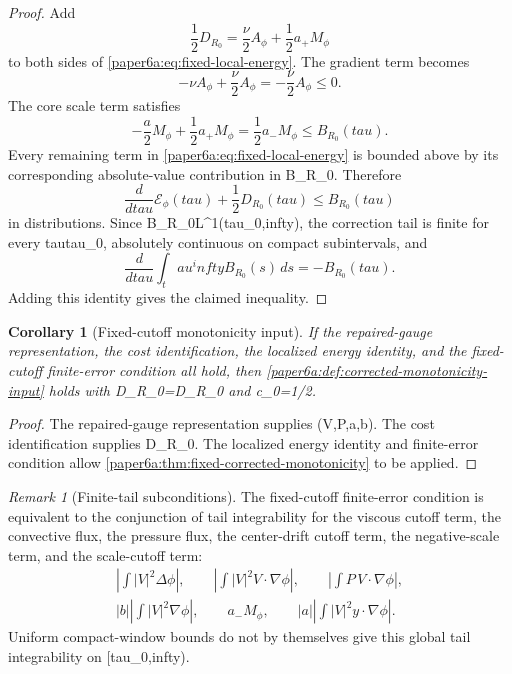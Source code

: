 \documentclass[11pt]{amsart}
\def\({}%
\def\){}%
\def\tilde#1{#1}%
\def\mathfrak#1{#1}%
\def\tau{tau}%
\def\infty{infty}%
\theoremstyle{plain}
\newtheorem{corollary}[theorem]{Corollary}
\theoremstyle{definition}
\theoremstyle{remark}
\newtheorem{remark}[theorem]{Remark}
\begin{document}
\begin{proof}
Add
\[
  \frac12\tilde{\mathfrak D}_{R_0}
  =
  \frac{\nu}{2}A_\phi+\frac12a_+M_\phi
\]
to both sides of \eqref{paper6a:eq:fixed-local-energy}.  The gradient term
becomes
\[
  -\nu A_\phi+\frac{\nu}{2}A_\phi=-\frac{\nu}{2}A_\phi\le0.
\]
The core scale term satisfies
\[
  -\frac{a}{2}M_\phi+\frac12a_+M_\phi
  =
  \frac12a_-M_\phi
  \le B_{R_0}(\tau).
\]
Every remaining term in \eqref{paper6a:eq:fixed-local-energy} is bounded above
by its corresponding absolute-value contribution in \(B_{R_0}\).  Therefore
\[
  \frac{d}{d\tau}\mathcal E_\phi(\tau)
  +\frac12\tilde{\mathfrak D}_{R_0}(\tau)
  \le B_{R_0}(\tau)
\]
in distributions.  Since \(B_{R_0}\in L^1(\tau_0,\infty)\), the correction
tail is finite for every \(\tau\ge\tau_0\), absolutely continuous on compact
subintervals, and
\[
  \frac{d}{d\tau}\int_\tau^\infty B_{R_0}(s)\,ds=-B_{R_0}(\tau).
\]
Adding this identity gives the claimed inequality.
\end{proof}

\begin{corollary}[Fixed-cutoff monotonicity input]\label{paper6a:cor:fixed-input}
If the repaired-gauge representation, the cost identification, the localized
energy identity, and the fixed-cutoff finite-error condition all hold, then
\cref{paper6a:def:corrected-monotonicity-input} holds with
\(\mathcal D_{R_0}=\tilde{\mathfrak D}_{R_0}\) and \(c_0=1/2\).
\end{corollary}

\begin{proof}
The repaired-gauge representation supplies \((V,P,a,b)\).  The cost
identification supplies \(\tilde{\mathfrak D}_{R_0}\).  The localized energy
identity and finite-error condition allow
\cref{paper6a:thm:fixed-corrected-monotonicity} to be applied.
\end{proof}

\begin{remark}[Finite-tail subconditions]\label{paper6a:rem:fixed-tail-subconditions}
The fixed-cutoff finite-error condition is equivalent to the conjunction of tail
integrability for the viscous cutoff term, the convective flux, the pressure
flux, the center-drift cutoff term, the negative-scale term, and the
scale-cutoff term:
\[
\begin{gathered}
  \left|\int |V|^2\Delta\phi\right|,\qquad
  \left|\int |V|^2V\cdot\nabla\phi\right|,\qquad
  \left|\int P\,V\cdot\nabla\phi\right|,\\
  |b|\left|\int |V|^2\nabla\phi\right|,\qquad
  a_-M_\phi,\qquad
  |a|\left|\int |V|^2y\cdot\nabla\phi\right|.
\end{gathered}
\]
Uniform compact-window bounds do not by themselves give this global tail
integrability on \([\tau_0,\infty)\).
\end{remark}
\end{document}

